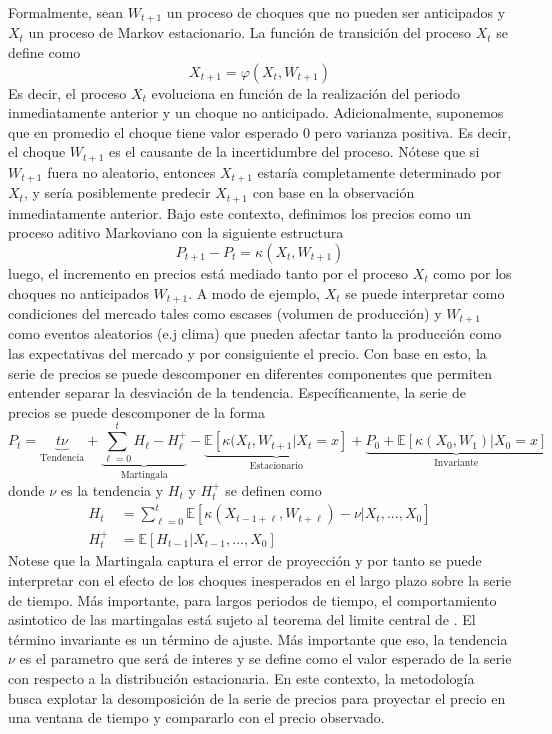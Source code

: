 \documentclass{article}
\begin{document}
Formalmente, sean $W_{t+1}$ un proceso de choques que no pueden ser anticipados y $X_t$ un proceso de Markov estacionario. La función de transición del proceso $X_t$ se define como 
\begin{equation}
    X_{t+1} = \varphi\left(X_t,W_{t+1}\right)
\end{equation}
Es decir, el proceso $X_t$ evoluciona en función de la realización del periodo inmediatamente anterior y un choque no anticipado. Adicionalmente, suponemos que en promedio el choque tiene valor esperado 0 pero varianza positiva. Es decir, el choque $W_{t+1}$ es el causante de la incertidumbre del proceso. Nótese que si  $W_{t+1}$ fuera no aleatorio, entonces $X_{t+1}$ estaría completamente determinado por $X_t$, y sería posiblemente predecir $X_{t+1}$ con base en la observación inmediatamente anterior. Bajo este contexto, definimos los precios como un proceso aditivo Markoviano con la siguiente estructura
\begin{equation}
    P_{t+1}-P_t=\kappa(X_t,W_{t+1})
\end{equation}
luego, el incremento en precios está mediado tanto por el proceso $X_t$ como por los choques no anticipados $W_{t+1}$. A modo de ejemplo, $X_t$ se puede interpretar como condiciones del mercado tales como escases (volumen de producción) y $W_{t+1}$ como eventos aleatorios (e.j clima) que pueden afectar tanto la producción como las expectativas del mercado y por consiguiente el precio. Con base en esto, la serie de precios se puede descomponer en diferentes componentes que permiten entender separar la desviación de la tendencia. Específicamente, la serie de precios se puede descomponer de la forma
\begin{equation}
    P_t = \underbrace{t\nu}_{\text{Tendencia}} + \underbrace{\sum_{\ell=0}^t H_\ell - H_\ell^+}_{\text{Martingala}} - \underbrace{\mathbb{E}\left[\kappa(X_t,W_{t+1}\big\vert X_t=x\right]}_{\text{Estacionario}}+\underbrace{P_0+\mathbb{E}\left[\kappa(X_0,W_{1})\big\vert X_0=x\right]}_{\text{Invariante}}
\end{equation}
donde $\nu$ es la tendencia y $H_t$ y $H_t^+$ se definen como 
\begin{align*}
    H_t &= \sum_{\ell=0}^t \mathbb{E}\left[\kappa(X_{t-1+\ell},W_{t+\ell})-\nu\vert X_t,...,X_0\right] \\ 
    H_t^+ &= \mathbb{E}\left[H_{t-1}\vert X_{t-1},...,X_0\right]
\end{align*}
Notese que la Martingala captura el error de proyección y por tanto se puede interpretar con el efecto de los choques inesperados en el largo plazo sobre la serie de tiempo. Más importante, para largos periodos de tiempo, el comportamiento asintotico de las martingalas está sujeto al teorema del limite central  de \citet{Billingsley61}. El término invariante es un término de ajuste. Más importante que eso, la tendencia $\nu$ es el parametro que será de interes y se define como el valor esperado de la serie con respecto a la distribución estacionaria. En este contexto, la metodología busca explotar la desomposición de la serie de precios para proyectar el precio en una ventana de tiempo y compararlo con el precio observado.
\end{document}
